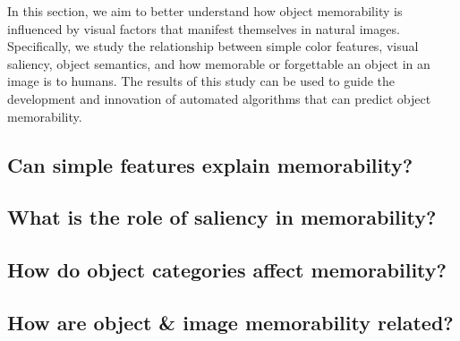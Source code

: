 

In this section, we aim to better understand how object memorability is influenced by visual factors that manifest themselves in natural images. Specifically, we study the relationship between simple color features, visual saliency, object semantics, and how memorable or forgettable an object in an image is to humans. The results of this study can be used to guide the development and innovation of automated algorithms that can predict object memorability.


\subsection{Can simple features explain memorability?}



\subsection{What is the role of saliency in memorability?}

 \label{sec:fix}

\subsection{How do object categories affect memorability?}\label{sec:obLabel}



\subsection{How are object \& image memorability related?}


